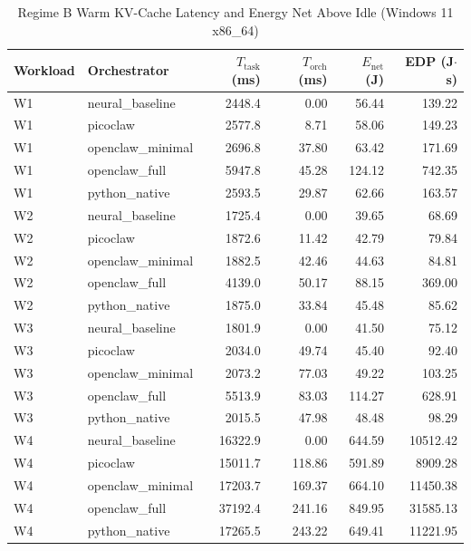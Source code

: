 \begin{table}[t]
\centering\small
\caption{Regime B Warm KV-Cache Latency and Energy Net Above Idle (Windows 11 x86_64)}
\label{tab:Windows_warm_cache}
\begin{tabular}{llrrrr}
\toprule
Workload & Orchestrator & $T_{\text{task}}$ (ms) & $T_{\text{orch}}$ (ms) & $E_{\text{net}}$ (J) & EDP (J$\cdot$s) \\
\midrule
W1 & neural\_baseline & 2448.4 & 0.00 & 56.44 & 139.22 \\
W1 & picoclaw & 2577.8 & 8.71 & 58.06 & 149.23 \\
W1 & openclaw\_minimal & 2696.8 & 37.80 & 63.42 & 171.69 \\
W1 & openclaw\_full & 5947.8 & 45.28 & 124.12 & 742.35 \\
W1 & python\_native & 2593.5 & 29.87 & 62.66 & 163.57 \\
W2 & neural\_baseline & 1725.4 & 0.00 & 39.65 & 68.69 \\
W2 & picoclaw & 1872.6 & 11.42 & 42.79 & 79.84 \\
W2 & openclaw\_minimal & 1882.5 & 42.46 & 44.63 & 84.81 \\
W2 & openclaw\_full & 4139.0 & 50.17 & 88.15 & 369.00 \\
W2 & python\_native & 1875.0 & 33.84 & 45.48 & 85.62 \\
W3 & neural\_baseline & 1801.9 & 0.00 & 41.50 & 75.12 \\
W3 & picoclaw & 2034.0 & 49.74 & 45.40 & 92.40 \\
W3 & openclaw\_minimal & 2073.2 & 77.03 & 49.22 & 103.25 \\
W3 & openclaw\_full & 5513.9 & 83.03 & 114.27 & 628.91 \\
W3 & python\_native & 2015.5 & 47.98 & 48.48 & 98.29 \\
W4 & neural\_baseline & 16322.9 & 0.00 & 644.59 & 10512.42 \\
W4 & picoclaw & 15011.7 & 118.86 & 591.89 & 8909.28 \\
W4 & openclaw\_minimal & 17203.7 & 169.37 & 664.10 & 11450.38 \\
W4 & openclaw\_full & 37192.4 & 241.16 & 849.95 & 31585.13 \\
W4 & python\_native & 17265.5 & 243.22 & 649.41 & 11221.95 \\
\bottomrule
\end{tabular}
\end{table}
